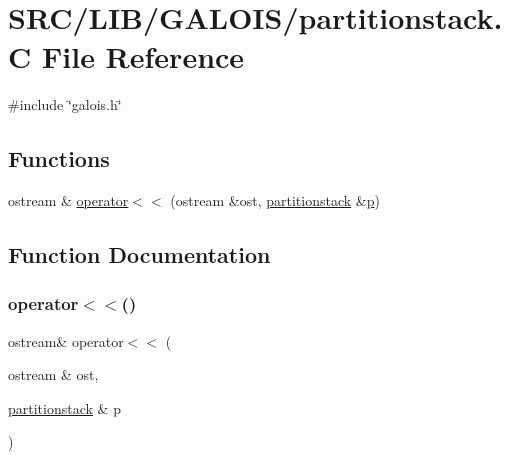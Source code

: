 \hypertarget{partitionstack_8_c}{}\section{S\+R\+C/\+L\+I\+B/\+G\+A\+L\+O\+I\+S/partitionstack.C File Reference}
\label{partitionstack_8_c}
{\ttfamily \#include \char`\"{}galois.\+h\char`\"{}}\newline
\subsection*{Functions}
\begin{DoxyCompactItemize}
\item 
ostream \& \mbox{\hyperlink{partitionstack_8_c_ad627dcdf45249dd7cf73ed97ae4cdcb0}{operator$<$$<$}} (ostream \&ost, \mbox{\hyperlink{classpartitionstack}{partitionstack}} \&\mbox{\hyperlink{alphabet2_8_c_a533391314665d6bf1b5575e9a9cd8552}{p}})
\end{DoxyCompactItemize}


\subsection{Function Documentation}
\mbox{\label{partitionstack_8_c_ad627dcdf45249dd7cf73ed97ae4cdcb0}} 
\subsubsection{\texorpdfstring{operator$<$$<$()}{operator<<()}}
{\footnotesize\ttfamily ostream\& operator$<$$<$ (\begin{DoxyParamCaption}\item[{ostream \&}]{ost,  }\item[{\mbox{\hyperlink{classpartitionstack}{partitionstack}} \&}]{p }\end{DoxyParamCaption})}

